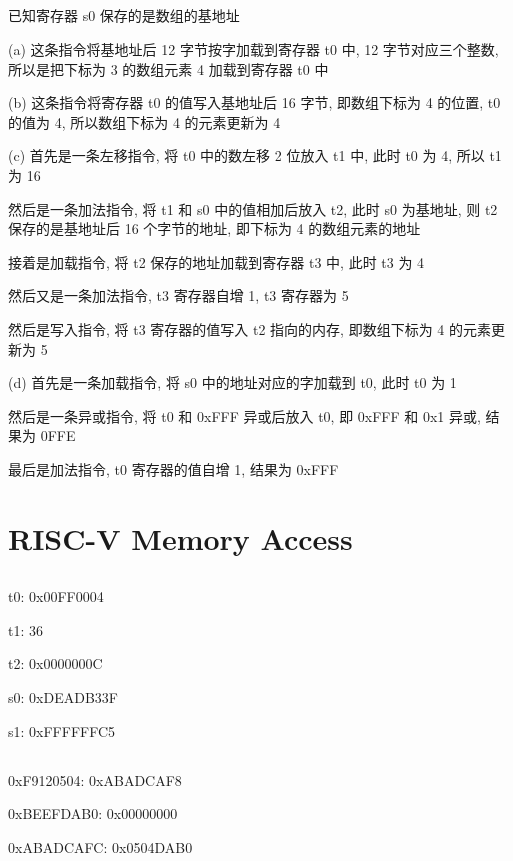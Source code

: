 \documentclass[UTF8,nofonts]{ctexart}
\begin{document}
\subsection{}

已知寄存器 s0 保存的是数组的基地址

(a) 这条指令将基地址后 12 字节按字加载到寄存器 t0 中, 12 字节对应三个整数, 所以是把下标为 3 的数组元素 4 加载到寄存器 t0 中

(b) 这条指令将寄存器 t0 的值写入基地址后 16 字节, 即数组下标为 4 的位置, t0 的值为 4, 所以数组下标为 4 的元素更新为 4

(c)
首先是一条左移指令, 将 t0 中的数左移 2 位放入 t1 中, 此时 t0 为 4, 所以 t1 为 16

然后是一条加法指令, 将 t1 和 s0 中的值相加后放入 t2, 此时 s0 为基地址, 则 t2 保存的是基地址后 16 个字节的地址, 即下标为 4 的数组元素的地址

接着是加载指令, 将 t2 保存的地址加载到寄存器 t3 中, 此时 t3 为 4

然后又是一条加法指令, t3 寄存器自增 1, t3 寄存器为 5

然后是写入指令, 将 t3 寄存器的值写入 t2 指向的内存, 即数组下标为 4 的元素更新为 5

(d)
首先是一条加载指令, 将 s0 中的地址对应的字加载到 t0, 此时 t0 为 1

然后是一条异或指令, 将 t0 和 0xFFF 异或后放入 t0, 即 0xFFF 和 0x1 异或, 结果为 0FFE

最后是加法指令, t0 寄存器的值自增 1, 结果为 0xFFF

\section{RISC-V Memory Access}
\subsection{}
t0: 0x00FF0004

t1: 36

t2: 0x0000000C

s0: 0xDEADB33F

s1: 0xFFFFFFC5

\subsection{}

0xF9120504: 0xABADCAF8

0xBEEFDAB0: 0x00000000

0xABADCAFC: 0x0504DAB0
\end{document}
